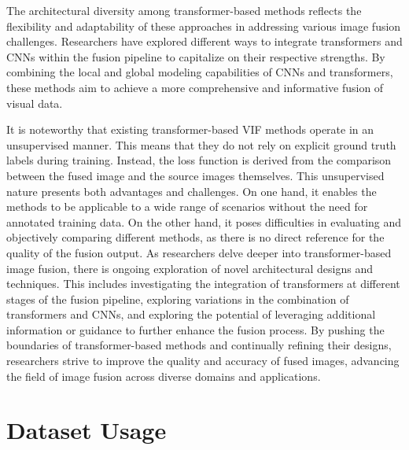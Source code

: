 The architectural diversity among transformer-based methods reflects the flexibility and adaptability of these approaches in addressing various image fusion challenges. Researchers have explored different ways to integrate transformers and CNNs within the fusion pipeline to capitalize on their respective strengths. By combining the local and global modeling capabilities of CNNs and transformers, these methods aim to achieve a more comprehensive and informative fusion of visual data. 

It is noteworthy that existing transformer-based VIF methods operate in an unsupervised manner. This means that they do not rely on explicit ground truth labels during training. Instead, the loss function is derived from the comparison between the fused image and the source images themselves. This unsupervised nature presents both advantages and challenges. On one hand, it enables the methods to be applicable to a wide range of scenarios without the need for annotated training data. On the other hand, it poses difficulties in evaluating and objectively comparing different methods, as there is no direct reference for the quality of the fusion output. As researchers delve deeper into transformer-based image fusion, there is ongoing exploration of novel architectural designs and techniques. This includes investigating the integration of transformers at different stages of the fusion pipeline, exploring variations in the combination of transformers and CNNs, and exploring the potential of leveraging additional information or guidance to further enhance the fusion process. By pushing the boundaries of transformer-based methods and continually refining their designs, researchers strive to improve the quality and accuracy of fused images, advancing the field of image fusion across diverse domains and applications.

\section{Dataset Usage}

